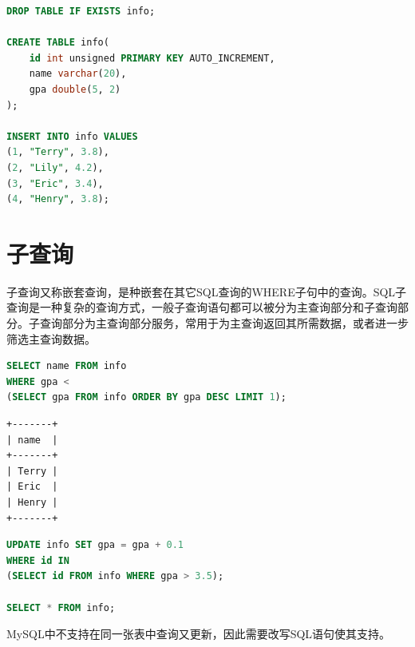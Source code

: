 \documentclass[12pt, openany, oneside]{book}
\begin{document}

\begin{lstlisting}[language=SQL]
DROP TABLE IF EXISTS info;

CREATE TABLE info(
    id int unsigned PRIMARY KEY AUTO_INCREMENT,
    name varchar(20),
    gpa double(5, 2)
);

INSERT INTO info VALUES
(1, "Terry", 3.8),
(2, "Lily", 4.2),
(3, "Eric", 3.4),
(4, "Henry", 3.8);
\end{lstlisting}

\vspace{0.5cm}

\section{子查询}

子查询又称嵌套查询，是种嵌套在其它SQL查询的WHERE子句中的查询。SQL子查询是一种复杂的查询方式，一般子查询语句都可以被分为主查询部分和子查询部分。子查询部分为主查询部分服务，常用于为主查询返回其所需数据，或者进一步筛选主查询数据。\\


\begin{lstlisting}[language=SQL]
SELECT name FROM info
WHERE gpa <
(SELECT gpa FROM info ORDER BY gpa DESC LIMIT 1);
\end{lstlisting}

\begin{tcolorbox}
\begin{verbatim}
+-------+
| name  |
+-------+
| Terry |
| Eric  |
| Henry |
+-------+
	\end{verbatim}
\end{tcolorbox}

\vspace{0.5cm}


\begin{lstlisting}[language=SQL]
UPDATE info SET gpa = gpa + 0.1
WHERE id IN
(SELECT id FROM info WHERE gpa > 3.5);

SELECT * FROM info;
\end{lstlisting}

MySQL中不支持在同一张表中查询又更新，因此需要改写SQL语句使其支持。\\

\end{document}
